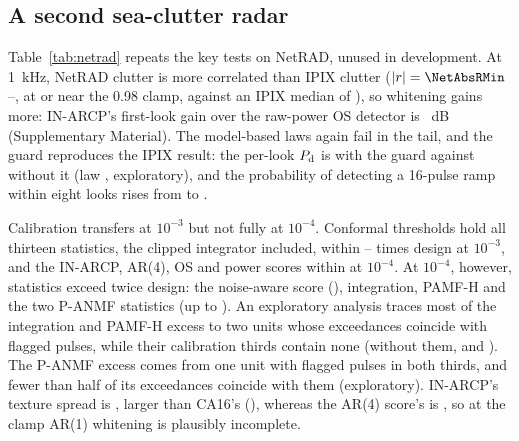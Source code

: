 \documentclass[journal]{IEEEtran}
\begin{document}
\subsection{A second sea-clutter radar}\label{sec:netrad}
\begin{table}[!t]
\centering\footnotesize
\caption{IPIX and NetRAD S-band sea clutter, same code and settings except the ANMF secondary cells (Section~\ref{sec:design}). Entries: $P_{\rm fa}/\alpha$ at $\alpha=0.01$ unless stated; guard row: per-look $P_{\rm d}$ at 10~dB, mean over looks 1--8; $P_{\rm d}$ in parentheses at 10~dB. Conformal rows: the 12 statistics other than the clipped integrator (conservative on IPIX). Injected interference 30~dB above the local power. Flagged pulses: NetRAD HH, certificate calibrated on their masks.}
\label{tab:netrad}
\setlength{\tabcolsep}{3pt}

\end{table}
Table~\ref{tab:netrad} repeats the key tests on NetRAD, unused in development. At 1~kHz, NetRAD clutter is more correlated than IPIX clutter ($|r|=\NetAbsRMin$--\NetAbsRMax, at or near the 0.98 clamp, against an IPIX median of \IpixAbsRMed), so whitening gains more: IN-ARCP's first-look gain over the raw-power OS detector is \NetOSGain~dB (Supplementary Material). The model-based laws again fail in the tail, and the guard reproduces the IPIX result: the per-look $P_{\rm d}$ is \NetGuardEight{} with the guard against \NetGuardZero{} without it (law \NetLawEight, exploratory), and the probability of detecting a 16-pulse ramp within eight looks rises from \NetRampZero{} to \NetRampEight.

Calibration transfers at $10^{-3}$ but not fully at $10^{-4}$. Conformal thresholds hold all thirteen statistics, the clipped integrator included, within \NetConfMinThree--\NetConfMaxThree{} times design at $10^{-3}$, and the IN-ARCP, AR(4), OS and power scores within \NetPerLookMax{} at $10^{-4}$. At $10^{-4}$, however, \NetNOverTwoFourWord{} statistics exceed twice design: the noise-aware score (\NetNaFour), integration, PAMF-H and the two P-ANMF statistics (up to \NetDwellMax). An exploratory analysis traces most of the integration and PAMF-H excess to two units whose exceedances coincide with flagged pulses, while their calibration thirds contain none (without them, \NetAttrDin{} and \NetAttrPamf). The P-ANMF excess comes from one unit with flagged pulses in both thirds, and fewer than half of its exceedances coincide with them (exploratory). IN-ARCP's texture spread is \NetSpreadIn, larger than CA16's (\NetSpreadCa), whereas the AR(4) score's is \NetSpreadInFour, so at the clamp AR(1) whitening is plausibly incomplete.
\end{document}
